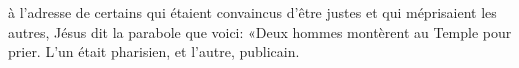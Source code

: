 \encetemps à l’adresse de certains
	qui étaient convaincus d’être justes et qui méprisaient les autres,
	Jésus dit la parabole que voici:
	«Deux hommes montèrent au Temple pour prier.
L’un était pharisien, et l’autre, publicain.
